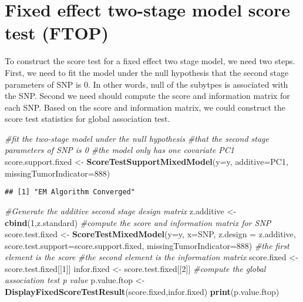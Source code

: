 \documentclass[11pt,]{article}
\newenvironment{Shaded}{\begin{snugshade}}{\end{snugshade}}
\newcommand{\CommentTok}[1]{\textcolor[rgb]{0.56,0.35,0.01}{\textit{#1}}}
\newcommand{\DataTypeTok}[1]{\textcolor[rgb]{0.13,0.29,0.53}{#1}}
\newcommand{\DecValTok}[1]{\textcolor[rgb]{0.00,0.00,0.81}{#1}}
\newcommand{\KeywordTok}[1]{\textcolor[rgb]{0.13,0.29,0.53}{\textbf{#1}}}
\newcommand{\NormalTok}[1]{#1}
\newcommand{\StringTok}[1]{\textcolor[rgb]{0.31,0.60,0.02}{#1}}
\begin{document}
\hypertarget{fixed-effect-two-stage-model-score-test-ftop}{%
\section{Fixed effect two-stage model score test
(FTOP)}\label{fixed-effect-two-stage-model-score-test-ftop}}

To construct the score test for a fixed effect two stage model, we need
two steps. First, we need to fit the model under the null hypothesis
that the second stage parameters of SNP is 0. In other words, null of
the subytpes is associated with the SNP. Second we need should compute
the score and information matrix for each SNP. Based on the score and
information matrix, we could construct the score test statistics for
global association test.

\begin{Shaded}
\begin{Highlighting}[]
\CommentTok{#fit the two-stage model under the null hypothesis}
\CommentTok{#that the second stage parameters of SNP is 0}
\CommentTok{#the model only has one covariate PC1}
\NormalTok{score.support.fixed <-}\StringTok{ }\KeywordTok{ScoreTestSupportMixedModel}\NormalTok{(}\DataTypeTok{y=}\NormalTok{y,}
                                                  \DataTypeTok{additive=}\NormalTok{PC1,}
                                                  \DataTypeTok{missingTumorIndicator=}\DecValTok{888}\NormalTok{)}
\end{Highlighting}
\end{Shaded}

\begin{verbatim}
## [1] "EM Algorithm Converged"
\end{verbatim}

\begin{Shaded}
\begin{Highlighting}[]
\CommentTok{#Generate the additive second stage design matrix}
\NormalTok{z.additive <-}\StringTok{ }\KeywordTok{cbind}\NormalTok{(}\DecValTok{1}\NormalTok{,z.standard)}
\CommentTok{#compute the score and information matrix for SNP}
\NormalTok{score.test.fixed <-}\StringTok{ }\KeywordTok{ScoreTestMixedModel}\NormalTok{(}\DataTypeTok{y=}\NormalTok{y,}
                                        \DataTypeTok{x=}\NormalTok{SNP,}
                                        \DataTypeTok{z.design =}\NormalTok{ z.additive,}
                                        \DataTypeTok{score.test.support=}\NormalTok{score.support.fixed,}
                                        \DataTypeTok{missingTumorIndicator=}\DecValTok{888}\NormalTok{)}
\CommentTok{#the first element is the score}
\CommentTok{#the second element is the information matrix}
\NormalTok{score.fixed <-}\StringTok{ }\NormalTok{score.test.fixed[[}\DecValTok{1}\NormalTok{]]}
\NormalTok{infor.fixed <-}\StringTok{ }\NormalTok{score.test.fixed[[}\DecValTok{2}\NormalTok{]]}
\CommentTok{#compute the global association test p value}
\NormalTok{p.value.ftop <-}\StringTok{ }\KeywordTok{DisplayFixedScoreTestResult}\NormalTok{(score.fixed,infor.fixed) }
\KeywordTok{print}\NormalTok{(p.value.ftop)}
\end{Highlighting}
\end{Shaded}
\end{document}
